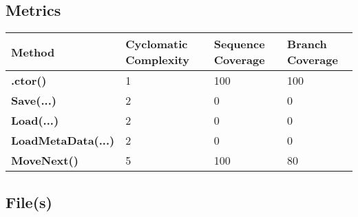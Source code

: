 \documentclass[a4paper,10pt]{article}
\begin{document}
\subsection{Metrics}
\begin{longtable}[l]{|l|l|l|l|}
\hline
\textbf{Method} & \textbf{Cyclomatic Complexity} & \textbf{Sequence Coverage} & \textbf{Branch Coverage}\\
\hline
\textbf{.ctor()} & 1 & 100 & 100\\
\hline
\textbf{Save(...)} & 2 & 0 & 0\\
\hline
\textbf{Load(...)} & 2 & 0 & 0\\
\hline
\textbf{LoadMetaData(...)} & 2 & 0 & 0\\
\hline
\textbf{MoveNext()} & 5 & 100 & 80\\
\hline
\end{longtable}
\subsection{File(s)}
\end{document}
